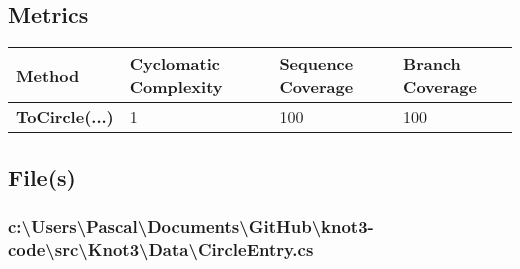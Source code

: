 \documentclass[a4paper,10pt]{article}
\begin{document}
\subsection{Metrics}
\begin{longtable}[l]{|l|l|l|l|}
\hline
\textbf{Method} & \textbf{Cyclomatic Complexity} & \textbf{Sequence Coverage} & \textbf{Branch Coverage}\\
\hline
\textbf{ToCircle(...)} & 1 & 100 & 100\\
\hline
\end{longtable}
\subsection{File(s)}
\subsubsection{c:\textbackslash Users\textbackslash Pascal\textbackslash Documents\textbackslash GitHub\textbackslash knot3-code\textbackslash src\textbackslash Knot3\textbackslash Data\textbackslash CircleEntry.cs}
\end{document}
